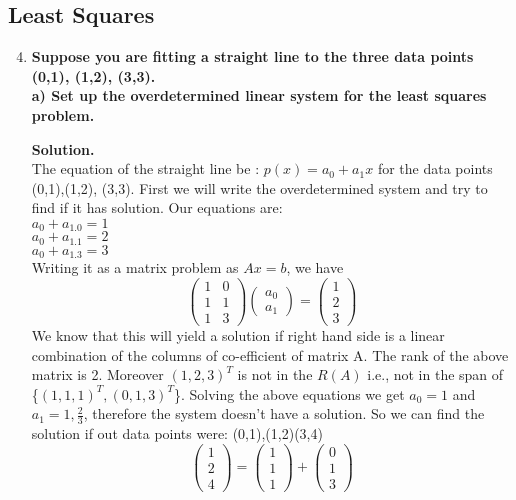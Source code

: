 \documentclass[12pt, oneside]{article}   	%
\begin{document}
\subsection*{Least Squares}


\begin{enumerate}
	\setcounter{enumi}{3}
	\item \textbf{ Suppose you are fitting a straight line to the three data points (0,1), (1,2), (3,3). }\\
	
	\textbf{a) Set up the overdetermined linear system for the least squares problem.}
	
	\textbf{Solution.}\\
	
	The equation of the straight line be : $p(x)=a_0 +a_1x$ for the data points (0,1),(1,2), (3,3). First we will write the overdetermined system and try to find if it has solution. Our equations are:\\
	
	$ a_0 +a_1.0=1$\\
	$ a_0 +a_1.1=2$\\
	$ a_0 +a_1.3=3$\\
	
	Writing it as a matrix problem as $Ax=b$, we have\\
	
	$$\left(\begin{array}{cc}1&0\\1&1\\1&3\end{array}\right)\left(\begin{array}{c}a_0\\a_1\end{array}\right)=\left(\begin{array}{c}1\\2\\3\end{array}\right)$$
	We know that this will yield a solution if right hand side is a linear combination of the columns of co-efficient of matrix A. The rank of the above matrix is 2. Moreover $(1,2,3)^T$ is not in the $R(A)$ i.e., not in the span of \{$(1,1,1)^T,(0,1,3)^T$\}. Solving the above equations we get $a_0=1$ and $a_1=1, \frac{2}{3}$, therefore the system doesn't have a solution. So we can find the solution if out data points were: (0,1),(1,2)(3,4)
		$$\left(\begin{array}{c}1\\2\\4\end{array}\right)=\left(\begin{array}{c}1\\1\\1\end{array}\right)+ \left(\begin{array}{c}0\\1\\3\end{array}\right)$$
		

\end{enumerate}
\end{document}
